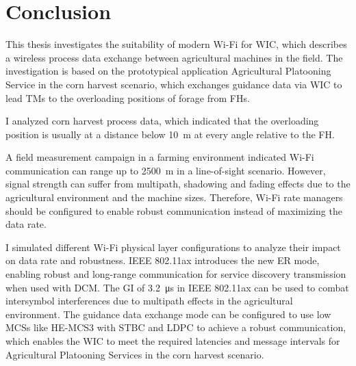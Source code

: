 \chapter{Conclusion}
\acresetall
\begin{comment}
    \begin{itemize}
    \item summarize again what your paper did, but now emphasize more the results, and comparisons
    \item write conclusions that can be drawn from the results found and the discussion presented in the paper
    \item future work (be very brief, explain what, but not much how, do not speculate about results or impact)
    \item recommended length: one page.
    \end{itemize}
\end{comment}
This thesis investigates the suitability of modern Wi-Fi for \ac{WIC}, which describes a wireless process data exchange between agricultural machines in the field.
The investigation is based on the prototypical application Agricultural Platooning Service in the corn harvest scenario, which exchanges guidance data via \ac{WIC} to lead \acp{TM} to the overloading positions of forage from \ac{FH}s.

I analyzed corn harvest process data, which indicated that the overloading position is usually at a distance below \SI{10}{\metre} at every angle relative to the \ac{FH}.

A field measurement campaign in a farming environment indicated Wi-Fi communication can range up to \SI{2500}{\metre} in a line-of-sight scenario.
However, signal strength can suffer from multipath, shadowing and fading effects due to the agricultural environment and the machine sizes.
Therefore, Wi-Fi rate managers should be configured to enable robust communication instead of maximizing the data rate.

I simulated different Wi-Fi physical layer configurations to analyze their impact on data rate and robustness.
IEEE 802.11ax introduces the new \ac{ER} mode, enabling robust and long-range communication for service discovery transmission when used with \ac{DCM}.
The \ac{GI} of \SI{3.2}{\micro\second} in IEEE 802.11ax can be used to combat intersymbol interferences due to multipath effects in the agricultural environment.
The guidance data exchange mode can be configured to use low \acp{MCS} like \ac{HE}-\ac{MCS}3 with \ac{STBC} and \ac{LDPC} to achieve a robust communication,
which enables the \ac{WIC} to meet the required latencies and message intervals for Agricultural Platooning Services in the corn harvest scenario.

